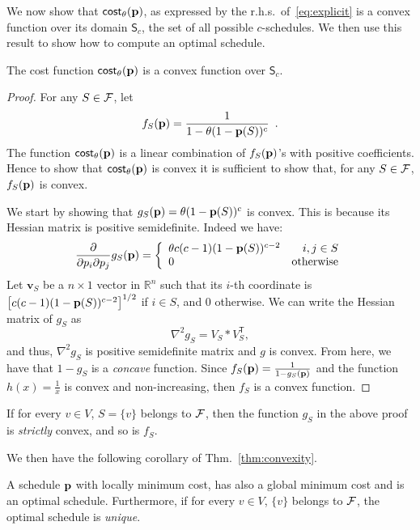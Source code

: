 We now show that $\mathsf{cost}_\theta(\mathbf{p})$, as expressed by the r.h.s.~of~\eqref{eq:explicit}
is a convex function over its domain $\mathsf{S}_c$, the set of all possible
$c$-schedules. We then use this result to show how to compute an optimal schedule.

\begin{theorem}\label{thm:convexity}
	The cost function $\mathsf{cost}_\theta(\mathbf{p})$ is a convex function over
	$\mathsf{S}_c$.
\end{theorem}
\begin{proof}
	For any $S\in\mathcal{F}$, let
	\[
		f_S(\mathbf{p}) = \frac{1}{1 - \theta(1-\mathbf{p}(S))^c}\enspace.
	\]
	The function $\mathsf{cost}_\theta(\mathbf{p})$ is a linear combination of
	$f_S(\mathbf{p})$'s with positive coefficients. Hence to show that
	$\mathsf{cost}_\theta(\mathbf{p})$ is convex it is sufficient to show that, for any
	$S\in\mathcal{F}$, $f_S(\mathbf{p})$ is convex.

	We start by showing that $g_S(\mathbf{p}) = \theta(1-\mathbf{p}(S))^c$ is convex.
	This is because its Hessian matrix is positive semidefinite. Indeed we have:
	\[
		\frac{\partial}{\partial p_i \partial p_j} g_S(\mathbf{p}) = \left\{
		\begin{array}{lr}
		\theta c(c-1) (1-\mathbf{p}(S))^{c-2} &  i,j \in S\\
		0 &  \text{otherwise}
		\end{array}
		\right.
	\]
	Let $\mathbf{v}_S$ be a $n\times 1$ vector in $\mathbb{R}^n$ such that its
	$i$-th coordinate is $\left[c(c-1) (1-\mathbf{p}(S))^{c-2} \right]^{1/2}$ if $i\in
	S$, and $0$ otherwise. We can write the Hessian matrix of $g_S$ as
	\[
		\nabla^2 g_S = V_S * V_S^\mathsf{T},
	\]
	and thus, $\nabla^2 g_S$ is positive semidefinite matrix and $g$ is convex.
	From here, we have that $1-g_S$ is a \emph{concave} function. Since
	$f_S(\mathbf{p})=\frac{1}{1-g_S(\mathbf{p})}$ and the function $h(x)=\frac{1}{x}$ is
	convex and non-increasing, then $f_S$ is a convex function.
\end{proof}

If for every $v\in V$, $S=\{v\}$ belongs to $\mathcal{F}$, then the
function $g_S$ in the above proof is \emph{strictly} convex, and so is $f_S$.

We then have the following corollary of Thm.~\ref{thm:convexity}.
\begin{corollary}
	A schedule $\mathbf{p}$ with locally minimum cost, has also a global minimum cost
	and is an optimal schedule. Furthermore, if for every $v\in V$, $\{v\}$
	belongs to $\mathcal{F}$, the optimal schedule is \emph{unique}.
\end{corollary}


